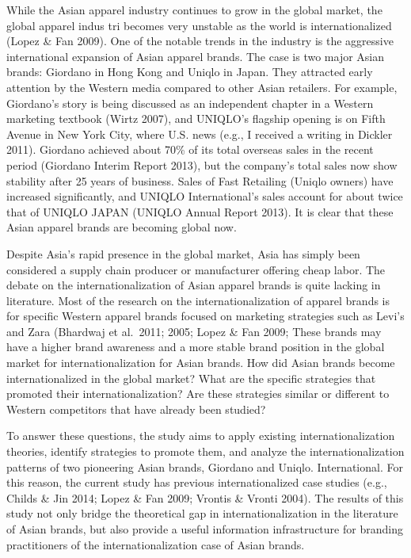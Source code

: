 \documentclass[12pt,a4paper]{article}
\begin{document}
While the Asian apparel industry continues to grow in the global market,
the global apparel indus tri becomes very unstable as the world is
internationalized (Lopez \& Fan 2009). One of the notable trends in the
industry is the aggressive international expansion of Asian apparel
brands. The case is two major Asian brands: Giordano in Hong Kong and
Uniqlo in Japan. They attracted early attention by the Western media
compared to other Asian retailers. For example, Giordano's story is
being discussed as an independent chapter in a Western marketing
textbook (Wirtz 2007), and UNIQLO's flagship opening is on Fifth Avenue
in New York City, where U.S. news (e.g., I received a writing in Dickler
2011). Giordano achieved about 70\% of its total overseas sales in the
recent period (Giordano Interim Report 2013), but the company's total
sales now show stability after 25 years of business. Sales of Fast
Retailing (Uniqlo owners) have increased significantly, and UNIQLO
International's sales account for about twice that of UNIQLO JAPAN
(UNIQLO Annual Report 2013). It is clear that these Asian apparel brands
are becoming global now.

Despite Asia's rapid presence in the global market, Asia has simply been
considered a supply chain producer or manufacturer offering cheap labor.
The debate on the internationalization of Asian apparel brands is quite
lacking in literature. Most of the research on the internationalization
of apparel brands is for specific Western apparel brands focused on
marketing strategies such as Levi's and Zara (Bhardwaj et al.~2011;
2005; Lopez \& Fan 2009; These brands may have a higher brand awareness
and a more stable brand position in the global market for
internationalization for Asian brands. How did Asian brands become
internationalized in the global market? What are the specific strategies
that promoted their internationalization? Are these strategies similar
or different to Western competitors that have already been studied?

To answer these questions, the study aims to apply existing
internationalization theories, identify strategies to promote them, and
analyze the internationalization patterns of two pioneering Asian
brands, Giordano and Uniqlo. International. For this reason, the current
study has previous internationalized case studies (e.g., Childs \& Jin
2014; Lopez \& Fan 2009; Vrontis \& Vronti 2004). The results of this
study not only bridge the theoretical gap in internationalization in the
literature of Asian brands, but also provide a useful information
infrastructure for branding practitioners of the internationalization
case of Asian brands.
\end{document}
